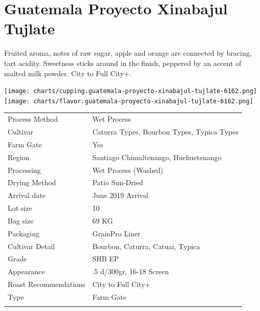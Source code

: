 \documentclass[10pt,twoside,footinclude=true,headinclude=true]{scrbook} %
\newlength{\mysize}
\newcommand{\myfontsize}[1]{
  \setlength{\mysize}{#1pt}
  \fontsize{\mysize}{1.2\mysize}
  \selectfont
}
\begin{document}

\chapter*{Guatemala Proyecto Xinabajul Tujlate}
 
\begin{addmargin}[2.2em]{2.2em}
\small
\justify
Fruited aroma, notes of raw sugar, apple and orange are connected by bracing, tart acidity. Sweetness sticks around in the finish, peppered by an accent of malted milk powder. City to Full City+.
\end{addmargin}

\centering
\vspace{2em}
\texttt{[image: charts/cupping.guatemala-proyecto-xinabajul-tujlate-6162.png]}
\texttt{[image: charts/flavor.guatemala-proyecto-xinabajul-tujlate-6162.png]}

\vspace{1em}
\begin{table}[htbp]
\myfontsize{7}
\hspace*{2.2em}
\begin{tabular}{ >{\raggedleft\arraybackslash}p{3.6cm}!{\color{lightgray}\vrule}p{7cm} }
\hline
  Process Method & Wet Process \\
  \hline
  Cultivar & Caturra Types, Bourbon Types, Typica Types \\
  \hline
  Farm Gate & Yes \\
  \hline
  Region & Santiago Chimaltenango, Huehuetenango \\
  \hline
  Processing & Wet Process (Washed) \\
  \hline
  Drying Method & Patio Sun-Dried \\
  \hline
  Arrival date & June 2019 Arrival \\
  \hline
  Lot size & 10 \\
  \hline
  Bag size & 69 KG \\
  \hline
  Packaging & GrainPro Liner \\
  \hline
  Cultivar Detail & Bourbon, Caturra, Catuai, Typica \\
  \hline
  Grade & SHB EP \\
  \hline
  Appearance & .5 d/300gr, 16-18 Screen \\
  \hline
  Roast Recommendations & City to Full City+ \\
  \hline
  Type & Farm Gate \\
  \hline

\end{tabular}
\end{table}
\end{document}
